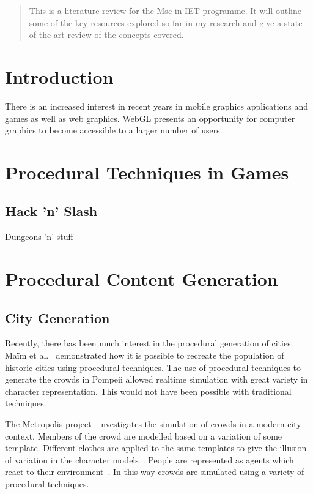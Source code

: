 \documentclass[12pt]{article}
\begin{document}
\maketitle

\clearpage

\begin{abstract}
This is a literature review for the Msc in IET programme.
It will outline some of the key resources explored so far in my research and give a state-of-the-art review of the concepts covered.
\end{abstract}

\clearpage

\section{Introduction}
There is an increased interest in recent years in mobile graphics applications and games as well as web graphics.
WebGL presents an opportunity for computer graphics to become accessible to a larger number of users.

\section{Procedural Techniques in Games}

\subsection{Hack 'n' Slash}
Dungeons 'n' stuff

\section{Procedural Content Generation}

\subsection{City Generation}
Recently, there has been much interest in the procedural generation of cities.
Ma\"{i}m et al.~\cite{maim2007populating} demonstrated how it is possible to recreate the population of historic cities using procedural techniques.
The use of procedural techniques to generate the crowds in Pompeii allowed realtime simulation with great variety in character representation.
This would not have been possible with traditional techniques.

The Metropolis project~\cite{web:metropolis} investigates the simulation of crowds in a modern city context.
Members of the crowd are modelled based on a variation of some template.
Different clothes are applied to the same templates to give the illusion of variation in the character models~\cite{mcdonnell2007pipeline}.
People are represented as agents which react to their environment~\cite{ulicny2002towards}.
In this way crowds are simulated using a variety of procedural techniques.
\end{document}
